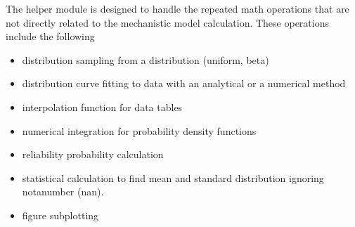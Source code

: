 \documentclass[letterpaper,10pt,english]{sphinxmanual}
\begin{document}
\sphinxAtStartPar
The helper module is designed to handle the repeated math operations that are not directly related to the mechanistic model calculation. These operations include the following
\begin{itemize}
\item {} 
\sphinxAtStartPar
distribution sampling from a distribution (uniform, beta)

\item {} 
\sphinxAtStartPar
distribution curve fitting to data with an analytical or a numerical method

\item {} 
\sphinxAtStartPar
interpolation function for data tables

\item {} 
\sphinxAtStartPar
numerical integration for probability density functions

\item {} 
\sphinxAtStartPar
reliability probability calculation

\item {} 
\sphinxAtStartPar
statistical calculation to find mean and standard distribution ignoring not\sphinxhyphen{}a\sphinxhyphen{}number (nan).

\item {} 
\sphinxAtStartPar
figure sub\sphinxhyphen{}plotting

\end{itemize}
\end{document}
